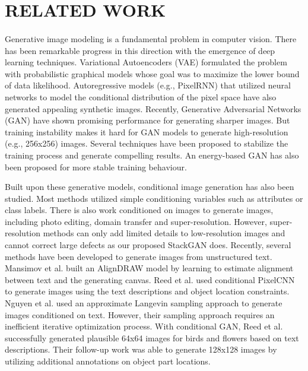 \documentclass[a4paper,12pt,oneside]{article}
\begin{document}
\newpage
\section{RELATED WORK}
\paragraph{}
Generative image modeling is a fundamental problem in computer vision. There has been remarkable progress in this direction with the emergence of deep learning techniques. Variational Autoencoders (VAE) formulated the problem with probabilistic graphical models whose goal was to maximize the lower bound of data likelihood. Autoregressive models (e.g., PixelRNN) that utilized neural networks to model the conditional distribution of the pixel space have also generated appealing synthetic images. Recently, Generative Adversarial Networks (GAN) have shown promising performance for generating sharper images. But training instability makes it hard for GAN models to generate high-resolution (e.g., 256x256) images. Several techniques have been proposed to stabilize the training process and generate compelling results. An energy-based GAN has also been proposed for more stable training behaviour. 

Built upon these generative models, conditional image generation has also been studied. Most methods utilized simple conditioning variables such as attributes or class labels. There is also work conditioned on images to generate images, including photo editing, domain transfer and super-resolution. However, super-resolution methods can only add limited details to low-resolution images and cannot correct large defects as our proposed StackGAN does. Recently, several methods have been developed to generate images from unstructured text. Mansimov et al. built an AlignDRAW model by learning to estimate alignment between text and the generating canvas. Reed et al. used conditional PixelCNN to generate images using the text descriptions and object location constraints. Nguyen et al. used an approximate Langevin sampling approach to generate images conditioned on text. However, their sampling approach requires an inefficient iterative optimization process. With conditional GAN, Reed et al. successfully generated plausible 64x64 images for birds and flowers based on text descriptions. Their follow-up work was able to generate 128x128 images by utilizing additional annotations on object part locations. 
\end{document}

